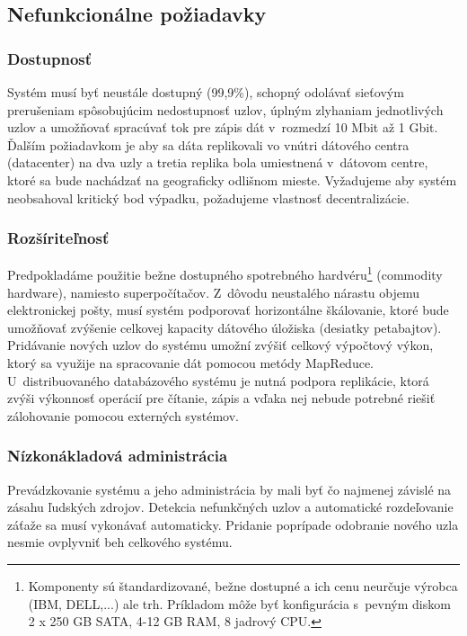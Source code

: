 \documentclass[11pt,twoside,a4paper]{book}
\begin{document}



\subsection{Nefunkcionálne požiadavky}

\subsubsection*{Dostupnosť}
Systém musí byť neustále dostupný (99,9\%), schopný odolávať sieťovým prerušeniam spôsobujúcim nedostupnosť uzlov, úplným zlyhaniam jednotlivých uzlov a umožňovať spracúvať tok pre zápis dát v~rozmedzí 10 Mbit až 1 Gbit. Ďalším požiadavkom je aby sa dáta replikovali vo vnútri dátového centra (datacenter) na dva uzly a tretia replika bola umiestnená v~dátovom centre, ktoré sa bude nachádzať na geograficky odlišnom mieste. Vyžadujeme aby systém neobsahoval kritický bod výpadku, požadujeme vlastnosť decentralizácie.

\subsubsection*{Rozšíriteľnosť}
Predpokladáme použitie bežne dostupného spotrebného hardvéru\footnote{Komponenty sú štandardizované, bežne dostupné a ich cenu neurčuje výrobca (IBM, DELL,...) ale trh. Príkladom môže byť konfigurácia s~pevným diskom 2 x 250 GB SATA, 4-12 GB RAM, 8 jadrový CPU.} (commodity hardware), namiesto superpočítačov. Z~dôvodu neustalého nárastu objemu elektronickej pošty, musí systém podporovať horizontálne škálovanie, ktoré bude umožňovať zvýšenie celkovej kapacity dátového úložiska (desiatky petabajtov). Pridávanie nových uzlov do systému umožní zvýšiť celkový výpočtový výkon, ktorý sa využije na spracovanie dát pomocou metódy MapReduce. U~distribuovaného databázového systému je nutná podpora replikácie, ktorá zvýši výkonnosť operácií pre čítanie, zápis a vďaka nej nebude potrebné riešiť zálohovanie pomocou externých systémov.

\subsubsection*{Nízkonákladová administrácia}
Prevádzkovanie systému a jeho administrácia by mali byť čo najmenej závislé na zásahu ľudských zdrojov. Detekcia nefunkčných uzlov a automatické rozdeľovanie záťaže sa musí vykonávať automaticky. Pridanie poprípade odobranie nového uzla nesmie ovplyvniť beh celkového systému.
\end{document}
